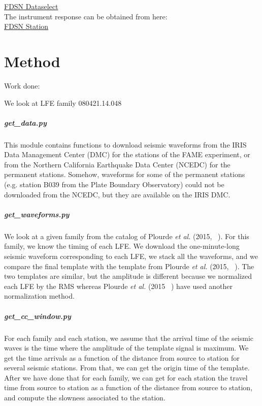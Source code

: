 \documentclass[main.tex]{subfiles}
\begin{document}
\href{http://service.ncedc.org/fdsnws/dataselect/1/#description-box}{FDSN Dataselect} \\

The instrument response can be obtained from here: \\

\href{http://service.ncedc.org/fdsnws/station/1/#description-box}{FDSN Station}

\chapter{Method}

Work done:

We look at LFE family 080421.14.048

\paragraph{get\_data.py} This module contains functions to download seismic waveforms from the IRIS Data Management Center (DMC) for the stations of the FAME experiment, or from the Northern California Earthquake Data Center (NCEDC) for the permanent stations. Somehow, waveforms for some of the permanent stations (e.g. station B039 from the Plate Boundary Observatory) could not be downloaded from the NCEDC, but they are available on the IRIS DMC.

\paragraph{get\_waveforms.py} We look at a given family from the catalog of Plourde \textit{et al.} (2015, ~\cite{PLO_2015}). For this family, we know the timing of each LFE. We download the one-minute-long seismic waveform corresponding to each LFE, we stack all the waveforms, and we compare the final template with the template from Plourde \textit{et al.} (2015, ~\cite{PLO_2015}). The two templates are similar, but the amplitude is different because we normalized each LFE by the RMS whereas Plourde \textit{et al.} (2015 ~\cite{PLO_2015}) have used another normalization method.

\paragraph{get\_cc\_window.py} For each family and each station, we assume that the arrival time of the seismic waves is the time where the amplitude of the template signal is maximum. We get the time arrivals as a function of the distance from source to station for several seismic stations. From that, we can get the origin time of the template. After we have done that for each family, we can get for each station the travel time from source to station as a function of the distance from source to station, and compute the slowness associated to the station.
\end{document}
